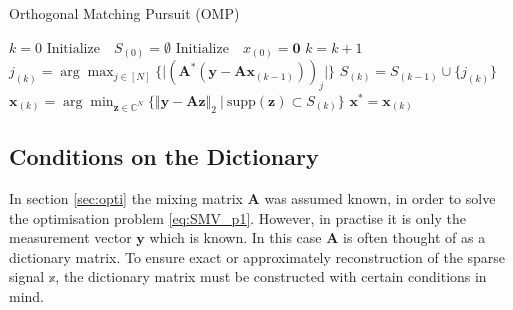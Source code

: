 \begin{algorithm}[H]
\caption{Orthogonal Matching Pursuit (OMP)}
\begin{algorithmic}[1]
			\State$k = 0$			
			\State$\text{Initialize} \quad S_{(0)} =\emptyset$ 
			\State$\text{Initialize} \quad x_{(0)} =\textbf{0}$
                \State$k = k + 1$
				\State$j_{(k)} = \arg \max_{j \in [N]} \{ \vert (\mathbf{A}^\ast (\mathbf{y} - \mathbf{Ax}_{(k-1)}))_j\vert \}$				
				\State$S_{(k)} = S_{(k-1)} \cup \lbrace j_{(k)} \rbrace$ 
				\State$\textbf{x}_{(k)} = \arg \min_{\mathbf{z} \in \mathbb{C}^N} \{ \Vert \mathbf{y} - \mathbf{Az} \Vert_2 \  \vert \ \text{supp}(\mathbf{z}) \subset S_{(k)} \}$
          		\EndWhile
          		\State$\mathbf{x}^\ast = \mathbf{x}_{(k)}$
            \EndProcedure
        \end{algorithmic} 
        \label{alg:OMP}
\end{algorithm}


      
\subsection{Conditions on the Dictionary}\label{sec:dic_conditions}
In section \ref{sec:opti} the mixing matrix $\mathbf{A}$ was assumed known, in order to solve the optimisation problem \eqref{eq:SMV_p1}. However, in practise it is only the measurement vector $\textbf{y}$ which is known. In this case $\textbf{A}$ is often thought of as a dictionary matrix. To ensure exact or approximately reconstruction of the sparse signal $\mathbb{x}$, the dictionary matrix must be constructed with certain conditions in mind. 


